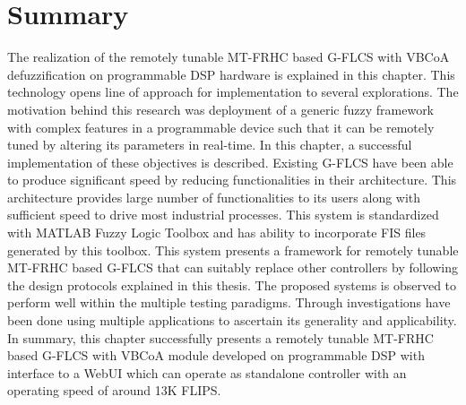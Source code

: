 \section{Summary}
The realization of the remotely tunable MT-FRHC based G-FLCS with VBCoA defuzzification on programmable DSP hardware is explained in this chapter. This technology opens line of approach for implementation to several explorations. The motivation behind this research was deployment of a generic fuzzy framework with complex features in a programmable device such that it can be remotely tuned by altering its parameters in real\hyp{}time. In this chapter, a successful implementation of these objectives is described. Existing G-FLCS have been able to produce significant speed by reducing functionalities in their architecture. This architecture provides large number of functionalities to its users along with sufficient speed to drive most industrial processes. This system is standardized with MATLAB Fuzzy Logic Toolbox and has ability to incorporate FIS files generated by this toolbox. This system presents a framework for remotely tunable MT-FRHC based G-FLCS that can suitably replace other controllers by following the design protocols explained in this thesis. The proposed systems is observed to perform well within the multiple testing paradigms. Through investigations have been done using multiple applications to ascertain its generality and applicability. In summary, this chapter successfully presents a remotely tunable MT-FRHC based G-FLCS with VBCoA module developed on programmable DSP with interface to a WebUI which can operate as standalone controller with an operating speed of around 13K FLIPS.

